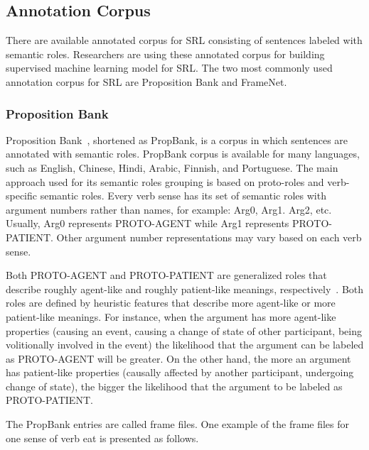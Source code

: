 \subsection{Annotation Corpus}
There are available annotated corpus for SRL consisting of sentences labeled with semantic roles. Researchers are using these annotated corpus for building supervised machine learning model for SRL. The two most commonly used annotation corpus for SRL are Proposition Bank and FrameNet.

\subsubsection{Proposition Bank}
Proposition Bank~\citep{kingsbury2002treebank}, shortened as PropBank, is a corpus in which sentences are annotated with semantic roles. PropBank corpus is available for many languages, such as English, Chinese, Hindi, Arabic, Finnish, and Portuguese. The main approach used for its semantic roles grouping is based on proto-roles and verb-specific semantic roles. Every verb sense has its set of semantic roles with argument numbers rather than names, for example: Arg0, Arg1. Arg2, etc. Usually, Arg0 represents PROTO-AGENT while Arg1 represents PROTO-PATIENT. Other argument number representations may vary based on each verb sense.

Both PROTO-AGENT and PROTO-PATIENT are generalized roles that describe roughly agent-like and roughly patient-like meanings, respectively~\citep{jurafsky2016speech}. Both roles are defined by heuristic features that describe more agent-like or more patient-like meanings. For instance, when the argument has more agent-like properties (causing an event, causing a change of state of other participant, being volitionally involved in the event) the likelihood that the argument can be labeled as PROTO-AGENT will be greater. On the other hand, the more an argument has patient-like properties (causally affected by another participant, undergoing change of state), the bigger the likelihood that the argument to be labeled as PROTO-PATIENT. 

The PropBank entries are called frame files. One example of the frame files for one sense of verb eat is presented as follows.
\\
\\

